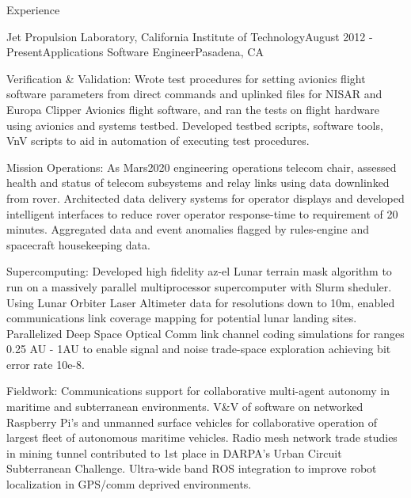 \documentclass{resume} %
\begin{document}
\begin{rSection}{Experience}
\begin{rSubsection}{Jet Propulsion Laboratory, California Institute of Technology}{August 2012 - Present}{Applications Software Engineer}{Pasadena, CA}


\item {Verification \& Validation:} Wrote test procedures for setting avionics flight software parameters from direct commands and uplinked files for NISAR and Europa Clipper Avionics flight software, and ran the tests on flight hardware using avionics and systems testbed. Developed testbed scripts, software tools, VnV scripts to aid in automation of executing test procedures.

\item {Mission Operations:} As Mars2020 engineering operations telecom chair, assessed health and status of telecom subsystems and relay links using data downlinked from rover. Architected data delivery systems for operator displays and developed intelligent interfaces to reduce rover operator response-time to requirement of 20 minutes. Aggregated data and event anomalies flagged by rules-engine and spacecraft housekeeping data.


\item {Supercomputing:} Developed high fidelity az-el Lunar terrain mask algorithm to run on a massively parallel multiprocessor supercomputer with Slurm sheduler. Using Lunar Orbiter Laser Altimeter data for resolutions down to 10m, enabled communications link coverage mapping for potential lunar landing sites. Parallelized Deep Space Optical Comm link channel coding simulations for ranges 0.25 AU - 1AU to enable signal and noise trade-space exploration achieving bit error rate 10e-8. 
 

\item {Fieldwork:} Communications support for collaborative multi-agent autonomy in maritime and subterranean environments. V\&V of software on networked Raspberry Pi’s and unmanned surface vehicles for collaborative operation of largest fleet of autonomous maritime vehicles. Radio mesh network trade studies in mining tunnel contributed to 1st place in DARPA’s Urban Circuit Subterranean Challenge. Ultra-wide band ROS integration to improve robot localization in GPS/comm deprived environments.



\end{rSubsection}
\end{rSection}
\end{document}
